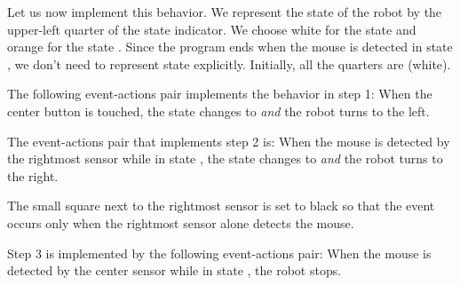 Let us now implement this behavior. We represent the state of the robot
by the upper-left quarter of the state indicator. We choose white for
the state  and orange for the state .
Since the program ends when the mouse is detected in state , we don't need to represent state  explicitly.
Initially, all the quarters are  (white).

The following event-actions pair implements the behavior in step 1:
When the center button is touched, the state changes to 
\emph{and} the robot turns to the left.

The event-actions pair that implements step 2 is:
When the mouse is detected by the rightmost sensor while in state
, the state changes to  \emph{and} the
robot turns to the right.

The small square next to the rightmost sensor is set to black so that
the event occurs only when the rightmost sensor alone detects the mouse.

Step 3 is implemented by the following event-actions pair:
When the mouse is detected by the center sensor while 
in state , the robot stops. 



\bigskip

\bigskip


\bigskip

